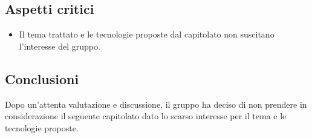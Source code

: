 \subsection{Aspetti critici}
\begin{itemize}
	\item Il tema trattato e le tecnologie proposte dal capitolato non suscitano l'interesse del gruppo.
\end{itemize}

\subsection{Conclusioni}
Dopo un'attenta valutazione e discussione, il gruppo ha deciso di non prendere in considerazione il seguente capitolato dato lo scarso interesse per il tema e le tecnologie proposte.
